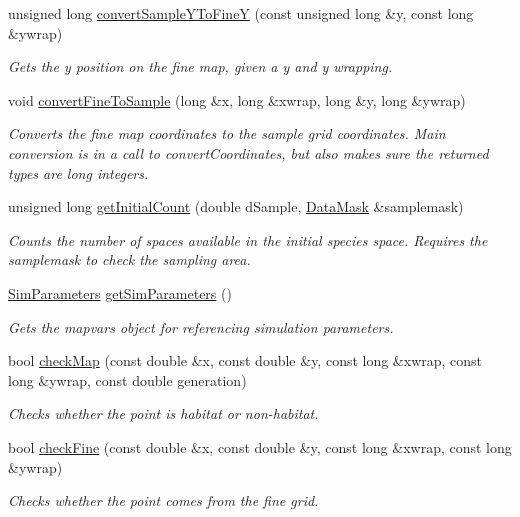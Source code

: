 \begin{DoxyCompactItemize}
unsigned long \hyperlink{class_map_a69ba72442bd3cbf7ee892ea0d2b6e4a1}{convert\+Sample\+Y\+To\+FineY} (const unsigned long \&y, const long \&ywrap)
\begin{DoxyCompactList}\small\item\em Gets the y position on the fine map, given a y and y wrapping. \end{DoxyCompactList}\item 
void \hyperlink{class_map_abd472c52b8aa58027621187de4a65683}{convert\+Fine\+To\+Sample} (long \&x, long \&xwrap, long \&y, long \&ywrap)
\begin{DoxyCompactList}\small\item\em Converts the fine map coordinates to the sample grid coordinates. Main conversion is in a call to convert\+Coordinates, but also makes sure the returned types are long integers. \end{DoxyCompactList}\item 
unsigned long \hyperlink{class_map_a5f31e18dd51244f51625b28e5314c68e}{get\+Initial\+Count} (double d\+Sample, \hyperlink{class_data_mask}{Data\+Mask} \&samplemask)
\begin{DoxyCompactList}\small\item\em Counts the number of spaces available in the initial species space. Requires the samplemask to check the sampling area. \end{DoxyCompactList}\item 
\hyperlink{struct_sim_parameters}{Sim\+Parameters} \hyperlink{class_map_ac560f241eb5a392d2599e11b00328964}{get\+Sim\+Parameters} ()
\begin{DoxyCompactList}\small\item\em Gets the mapvars object for referencing simulation parameters. \end{DoxyCompactList}\item 
bool \hyperlink{class_map_ac5e842ad3f8d76f2293a6b1be44071ca}{check\+Map} (const double \&x, const double \&y, const long \&xwrap, const long \&ywrap, const double generation)
\begin{DoxyCompactList}\small\item\em Checks whether the point is habitat or non-\/habitat. \end{DoxyCompactList}\item 
bool \hyperlink{class_map_aae9663c2b5bb78e89e2c476d1d1a409b}{check\+Fine} (const double \&x, const double \&y, const long \&xwrap, const long \&ywrap)
\begin{DoxyCompactList}\small\item\em Checks whether the point comes from the fine grid. \end{DoxyCompactList}\item 

\end{DoxyCompactItemize}
